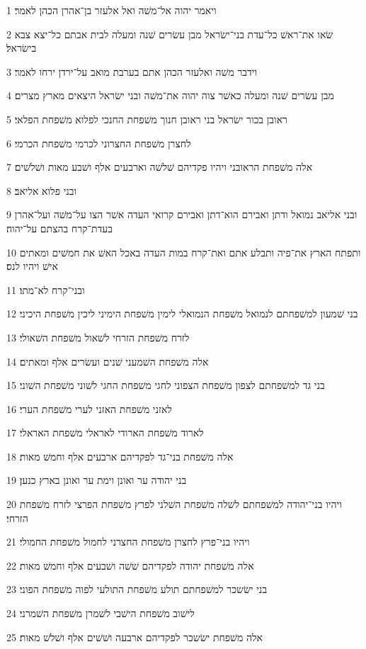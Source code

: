 \par 1 ויאמר יהוה אל־משׁה ואל אלעזר בן־אהרן הכהן לאמר׃
\par 2 שׂאו את־ראשׁ כל־עדת בני־ישׂראל מבן עשׂרים שׁנה ומעלה לבית אבתם כל־יצא צבא בישׂראל׃
\par 3 וידבר משׁה ואלעזר הכהן אתם בערבת מואב על־ירדן ירחו לאמר׃
\par 4 מבן עשׂרים שׁנה ומעלה כאשׁר צוה יהוה את־משׁה ובני ישׂראל היצאים מארץ מצרים׃
\par 5 ראובן בכור ישׂראל בני ראובן חנוך משׁפחת החנכי לפלוא משׁפחת הפלאי׃
\par 6 לחצרן משׁפחת החצרוני לכרמי משׁפחת הכרמי׃
\par 7 אלה משׁפחת הראובני ויהיו פקדיהם שׁלשׁה וארבעים אלף ושׁבע מאות ושׁלשׁים׃
\par 8 ובני פלוא אליאב׃
\par 9 ובני אליאב נמואל ודתן ואבירם הוא־דתן ואבירם קרואי העדה אשׁר הצו על־משׁה ועל־אהרן בעדת־קרח בהצתם על־יהוה׃
\par 10 ותפתח הארץ את־פיה ותבלע אתם ואת־קרח במות העדה באכל האשׁ את חמשׁים ומאתים אישׁ ויהיו לנס׃
\par 11 ובני־קרח לא־מתו׃
\par 12 בני שׁמעון למשׁפחתם לנמואל משׁפחת הנמואלי לימין משׁפחת הימיני ליכין משׁפחת היכיני׃
\par 13 לזרח משׁפחת הזרחי לשׁאול משׁפחת השׁאולי׃
\par 14 אלה משׁפחת השׁמעני שׁנים ועשׂרים אלף ומאתים׃
\par 15 בני גד למשׁפחתם לצפון משׁפחת הצפוני לחגי משׁפחת החגי לשׁוני משׁפחת השׁוני׃
\par 16 לאזני משׁפחת האזני לערי משׁפחת הערי׃
\par 17 לארוד משׁפחת הארודי לאראלי משׁפחת האראלי׃
\par 18 אלה משׁפחת בני־גד לפקדיהם ארבעים אלף וחמשׁ מאות׃
\par 19 בני יהודה ער ואונן וימת ער ואונן בארץ כנען׃
\par 20 ויהיו בני־יהודה למשׁפחתם לשׁלה משׁפחת השׁלני לפרץ משׁפחת הפרצי לזרח משׁפחת הזרחי׃
\par 21 ויהיו בני־פרץ לחצרן משׁפחת החצרני לחמול משׁפחת החמולי׃
\par 22 אלה משׁפחת יהודה לפקדיהם שׁשׁה ושׁבעים אלף וחמשׁ מאות׃
\par 23 בני ישׂשכר למשׁפחתם תולע משׁפחת התולעי לפוה משׁפחת הפוני׃
\par 24 לישׁוב משׁפחת הישׁבי לשׁמרן משׁפחת השׁמרני׃
\par 25 אלה משׁפחת ישׂשכר לפקדיהם ארבעה ושׁשׁים אלף ושׁלשׁ מאות׃
